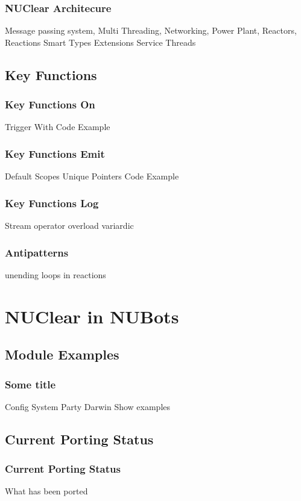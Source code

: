 \documentclass{beamer}
\begin{document}
\begin{frame}
    \frametitle{NUClear Architecure}
	Message passing system,
	Multi Threading,
	Networking,
	Power Plant,
	Reactors,
	Reactions
	Smart Types
	Extensions
	Service Threads
\end{frame}

\subsection{Key Functions}
\begin{frame}
    \frametitle{Key Functions On}
	Trigger
	With
	Code Example
\end{frame}

\begin{frame}
    \frametitle{Key Functions Emit}
	Default
	Scopes
	Unique Pointers
	Code Example
\end{frame}

\begin{frame}
    \frametitle{Key Functions Log}
	Stream operator overload
	variardic
\end{frame}

\begin{frame}
    \frametitle{Antipatterns}
	unending loops in reactions
\end{frame}

\section{NUClear in NUBots}
\subsection{Module Examples}
\begin{frame}
    \frametitle{Some title}
	Config System
	Party Darwin
	Show examples
\end{frame}

\subsection{Current Porting Status}
\begin{frame}
    \frametitle{Current Porting Status}
	What has been ported
\end{frame}
\end{document}

